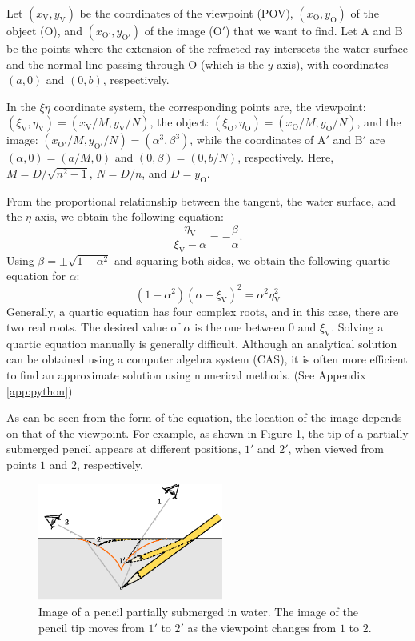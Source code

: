 \documentclass[twocolumn]{article}
\begin{document}
Let $(x_{\mathrm{V}}, y_{\mathrm{V}})$ be the coordinates of the viewpoint (POV), $(x_{\mathrm{O}}, y_{\mathrm{O}})$ of the object ($\mathrm{O}$), and $(x_{\mathrm{O'}}, y_{\mathrm{O'}})$ of the image ($\mathrm{O'}$) that we want to find. Let A and B be the points where the extension of the refracted ray intersects the water surface and the normal line passing through O (which is the $y$-axis), with coordinates $(a, 0)$ and $(0, b)$, respectively. 

In the $\xi\eta$ coordinate system, the corresponding points are, the viewpoint: $(\xi_{\mathrm{V}}, \eta_{\mathrm{V}})=(x_{\mathrm{V}}/M, y_{\mathrm{V}}/N)$, the object: $(\xi_{\mathrm{O}}, \eta_{\mathrm{O}})=(x_{\mathrm{O}}/M, y_{\mathrm{O}}/N)$, and the image: $(x_{\mathrm{O'}}/M, y_{\mathrm{O'}}/N)=(\alpha^3, \beta^3)$, while the coordinates of $\mathrm{A'}$ and $\mathrm{B'}$ are $(\alpha, 0)=(a/M, 0)$ and $(0, \beta)=(0, b/N)$, respectively. Here, $M=D/\sqrt{n^2-1}$, $N=D/n$, and $D=y_{\mathrm{O}}$. 

From the proportional relationship between the tangent, the water surface, and the $\eta$-axis, we obtain the following equation:
$$\dfrac{\eta_{\mathrm{V}}}{\xi_{\mathrm{V}}-\alpha}=-\dfrac{\beta}{\alpha}.$$
Using $\beta = \pm \sqrt{1-\alpha^2}$ and squaring both sides, we obtain the following quartic equation for $\alpha$:
\begin{equation}\label{eqn:tangent}
\left( 1 - \alpha^2 \right) \left(\alpha-\xi_{\mathrm{V}} \right)^2 = \alpha^2 \eta_{\mathrm{V}}^2
\end{equation}
Generally, a quartic equation has four complex roots, and in this case, there are two real roots. The desired value of $\alpha$ is the one between 0 and $\xi_{\mathrm{V}}$. Solving a quartic equation manually is generally difficult. Although an analytical solution can be obtained using a computer algebra system (CAS), it is often more efficient to find an approximate solution using numerical methods. (See Appendix \ref{app:python})

As can be seen from the form of the equation, the location of the image depends on that of the viewpoint. For example, as shown in Figure \ref{fig:pencil_view}, the tip of a partially submerged pencil appears at different positions, $1'$ and $2'$, when viewed from points $1$ and $2$, respectively.

\begin{figure}[h]
	\centering
	\includegraphics[width=2.4in]{figs/g43.eps}
	\caption{Image of a pencil partially submerged in water. The image of the pencil tip moves from $1'$ to $2'$ as the viewpoint changes from $1$ to $2$.}
	\label{fig:pencil_view}
\end{figure}
\end{document}
